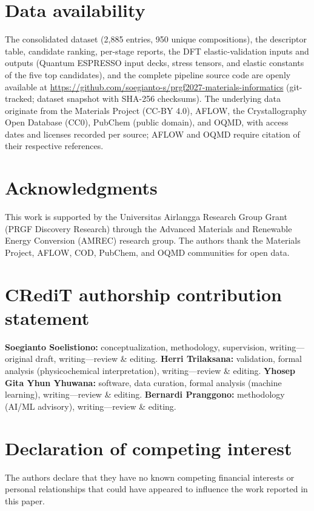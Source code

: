 \documentclass[11pt,a4paper]{article}
\begin{document}
\section*{Data availability}
The consolidated dataset (2{,}885 entries, 950 unique compositions), the descriptor table, candidate ranking, per-stage reports, the DFT elastic-validation inputs and outputs (Quantum ESPRESSO input decks, stress tensors, and elastic constants of the five top candidates), and the complete pipeline source code are openly available at \url{https://github.com/soegianto-s/prgf2027-materials-informatics} (git-tracked; dataset snapshot with SHA-256 checksums). The underlying data originate from the Materials Project (CC-BY 4.0), AFLOW, the Crystallography Open Database (CC0), PubChem (public domain), and OQMD, with access dates and licenses recorded per source; AFLOW and OQMD require citation of their respective references.

\section*{Acknowledgments}
This work is supported by the Universitas Airlangga Research Group Grant (PRGF Discovery Research) through the Advanced Materials and Renewable Energy Conversion (AMREC) research group. The authors thank the Materials Project, AFLOW, COD, PubChem, and OQMD communities for open data.

\section*{CRediT authorship contribution statement}
\textbf{Soegianto Soelistiono:} conceptualization, methodology, supervision, writing---original draft, writing---review \& editing. \textbf{Herri Trilaksana:} validation, formal analysis (physicochemical interpretation), writing---review \& editing. \textbf{Yhosep Gita Yhun Yhuwana:} software, data curation, formal analysis (machine learning), writing---review \& editing. \textbf{Bernardi Pranggono:} methodology (AI/ML advisory), writing---review \& editing.

\section*{Declaration of competing interest}
The authors declare that they have no known competing financial interests or personal relationships that could have appeared to influence the work reported in this paper.
\end{document}
